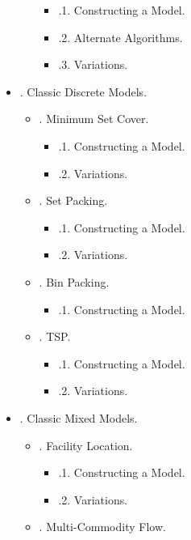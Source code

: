 \documentclass{article}
\begin{document}
\begin{itemize}
\begin{itemize}
\begin{itemize}
            \item {.1. Constructing a Model.}
            \item {.2. Alternate Algorithms.}
            \item {.3. Variations.}
        \end{itemize}
    \end{itemize}
    \item {. Classic Discrete Models.}
    \begin{itemize}
        \item {. Minimum Set Cover.}
        \begin{itemize}
            \item {.1. Constructing a Model.}
            \item {.2. Variations.}
        \end{itemize}
        \item {. Set Packing.}
        \begin{itemize}
            \item {.1. Constructing a Model.}
            \item {.2. Variations.}
        \end{itemize}
        \item {. Bin Packing.}
        \begin{itemize}
            \item {.1. Constructing a Model.}
        \end{itemize}
        \item {. TSP.}
        \begin{itemize}
            \item {.1. Constructing a Model.}
            \item {.2. Variations.}
        \end{itemize}
    \end{itemize}
    \item {. Classic Mixed Models.}
    \begin{itemize}
        \item {. Facility Location.}
        \begin{itemize}
            \item {.1. Constructing a Model.}
            \item {.2. Variations.}
        \end{itemize}
        \item {. Multi-Commodity Flow.}

\end{itemize}
\end{itemize}
\end{document}
